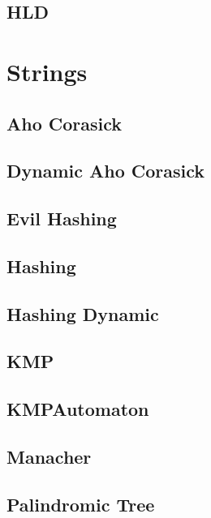 \subsection{HLD}
\raggedbottom
\hrulefill
\newpage

\section{Strings}
\subsection{Aho Corasick}
\raggedbottom
\hrulefill
\subsection{Dynamic Aho Corasick}
\raggedbottom
\hrulefill
\subsection{Evil Hashing}
\raggedbottom
\hrulefill
\subsection{Hashing}
\raggedbottom
\hrulefill
\subsection{Hashing Dynamic}
\raggedbottom
\hrulefill
\subsection{KMP}
\raggedbottom
\hrulefill
\subsection{KMPAutomaton}
\raggedbottom
\hrulefill
\subsection{Manacher}
\raggedbottom
\hrulefill
\subsection{Palindromic Tree}
\raggedbottom
\hrulefill
